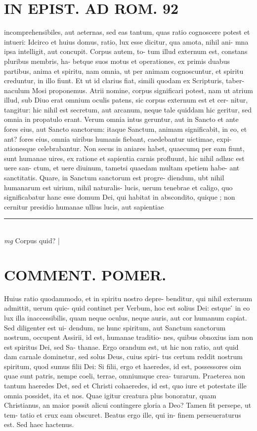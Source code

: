 \documentclass{article}
\begin{document}
\begin{pages}
\section*{IN EPIST. AD ROM.  92 }
\marginpar{[ p.]}\pstart incomprehensibiles, aut aeternas, sed eas tantum, quas ratio cognoscere potest et intueri: Idcirco et huius domus, ratio, lux esse dicitur, qua amota, nihil ani- mna ipsa intelligit, aut concupit. Corpus autem, to- tum illud externum est, constans pluribus membris, ha- betque suos motus et operationes, ex primis duabus partibus, anima et spiritu, nam omnia, ut per animam cognoscuntur, et spiritu creduntur, in illo fiunt. Et ut id clarius fiat, simili quodam ex Scripturis, taber- naculum Mosi proponemus. Atrii nomine, corpus significari potest, nam ut atrium illud, sub Diuo erat omnium oculis patens, sic corpus externum est et cer- nitur, tangitur: hic nihil est secretum, aut arcanum, neque tale quiddam hic geritur, sed omnia in propatulo erant. Verum omnia intus geruntur, aut in Sancto et ante fores eius, aut Sancto sanctorum: itaque Sanctum, animam significabit, in eo, et ant? fores eius, omnia uiribus humanis fiebant, caedebantur uictimae, expi- ationesque celebrabantur. Non secus in aniares habet, quaecumq per eam fiunt, sunt humanae uires, ex ratione et sapientia carnis profluunt, hic nihil adhuc est uere san- ctum, et uere diuinum, tametsi quaedam multam spetiem habe- ant sanctitatis. Quare, in Sanctum sanctorum est progre- diendum, ubt nihil humanarum est uirium, nihil naturalis- lucis, uerum tenebrae et caligo, quo significabatur hanc esse domum Dei, qui habitat in abscondito, quique ; non cernitur presidio humanae ullius lucis, aut sapientiae  \pend
\vspace{0.5cm}\noindent
\vspace{0.2cm}\rule{1cm}{0.2pt}\\ 
\hspace{0.2cm}\textit{mg}
\footnotesize Corpus quid? 
\normalsize| 
\section*{COMMENT. POMER.  }\pstart Huius ratio quodammodo, et in spiritu nostro depre- benditur, qui nihil externum admittit, uerum quic- quid continet per Verbum, hoc est solius Dei: estque ́ in eo lux illa inaccessibilis, quam neque oculus, neque  auris, aut cor humanum capiat. Sed diligenter est ui- dendum, ne hunc spiritum, aut Sanctum sanctorum nostrum, occupent Assirii, id est, humanae traditio- nes, quibus obnoxius iam non est spiritus Dei, sed Sa- thanae. Ergo orandum est, ut hic non ratio, aut quid dam carnale dominetur, sed solus Deus, cuius spiri- tus certum reddit nostrum spiritum, quod sumus filii Dei: Si filii, ergo et haeredes, id est, possessores oim quae sunt patris, nempe coeli, terrae, omniumque crea- turarum. Praeterea non tantum haeredes Det, sed et Christi cohaeredes, id est, quo iure et potestate ille omnia possidet, ita et nos. Quae igitur creatura plus bonoratur, quam Christianus, an maior possit alicui contingere gloria a Deo? Tamen fit persepe, ut tem- tatio et crux eam obscuret. Beatus ergo ille, qui in- finem perseueraturus est. Sed haec hactenus.   \pend
{}
{}

\end{pages}
\end{document}
